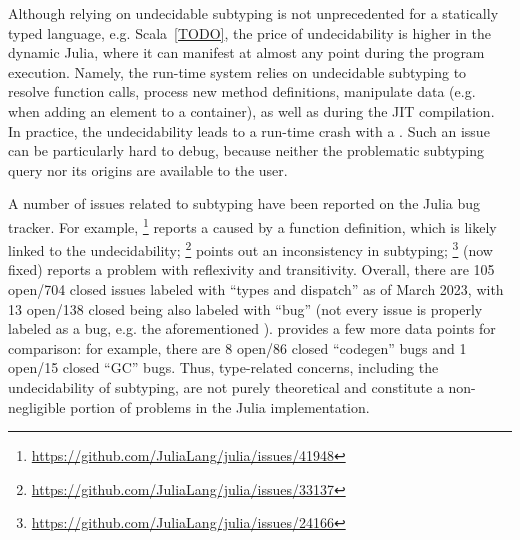 Although relying on undecidable subtyping is not unprecedented
for a statically typed language, e.g. Scala~\ref{TODO},
the price of undecidability
is higher in the dynamic Julia, where it
can manifest at almost any point during the program execution.
Namely, the run-time system relies on undecidable subtyping
to resolve function calls,
process new method definitions,
manipulate data (e.g. when adding an element to a container),
as well as during the JIT compilation.
In practice, the undecidability
leads to a run-time crash with a .
Such an issue can be particularly hard to debug,
because neither the problematic subtyping query nor its origins are available
to the user.

A number of issues related to subtyping have been reported
on the Julia bug tracker. For example,
\href{https://github.com/JuliaLang/julia/issues/41948}{}\footnote{
    \url{https://github.com/JuliaLang/julia/issues/41948}
} reports a  caused by a function definition,
which is likely linked to the undecidability;
\href{https://github.com/JuliaLang/julia/issues/33137}{}\footnote{
    \url{https://github.com/JuliaLang/julia/issues/33137}
} points out an inconsistency in subtyping; %
\href{https://github.com/JuliaLang/julia/issues/24166}{}\footnote{
    \url{https://github.com/JuliaLang/julia/issues/24166} 
} (now fixed) reports a problem with reflexivity and transitivity.
Overall, there are 105 open/704 closed issues labeled with ``types and
dispatch'' as of March 2023,
with 13 open/138 closed being also labeled with ``bug''
(not every issue is properly labeled as a bug,
e.g. the aforementioned
\href{https://github.com/JuliaLang/julia/issues/24166}{}).
 provides a few more data points for comparison:
for example, there are 8 open/86 closed ``codegen'' bugs
and 1 open/15 closed ``GC'' bugs.
Thus, type-related concerns, including the undecidability of subtyping,
are not purely theoretical and
constitute a non-negligible portion of problems in the Julia implementation.

